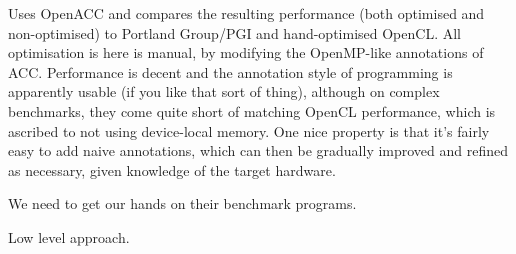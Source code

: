 \documentclass[a4paper, oneside, final]{memoir}
\begin{document}
Uses OpenACC and compares the resulting performance (both optimised
and non-optimised) to Portland Group/PGI and hand-optimised OpenCL.
All optimisation is here is manual, by modifying the OpenMP-like
annotations of ACC.  Performance is decent and the annotation style of
programming is apparently usable (if you like that sort of thing),
although on complex benchmarks, they come quite short of matching
OpenCL performance, which is ascribed to not using device-local
memory.  One nice property is that it's fairly easy to add naive
annotations, which can then be gradually improved and refined as
necessary, given knowledge of the target hardware.

We need to get our hands on their benchmark programs.

Low level approach.
\end{document}
